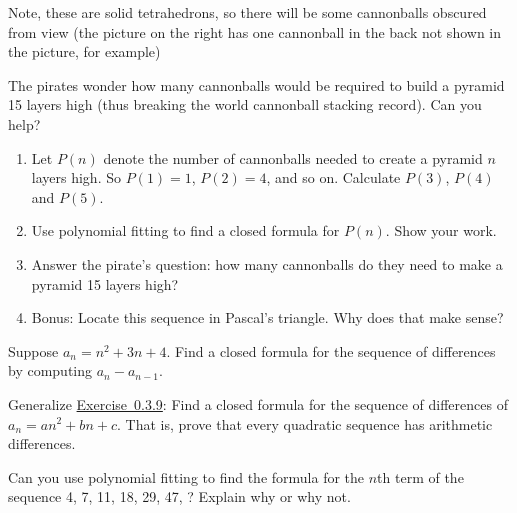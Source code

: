 \documentclass[11pt,]{book}
\theoremstyle{ptxplainnotitle}
\theoremstyle{ptxplaintitle}
\theoremstyle{ptxdefinitionnotitle}
\theoremstyle{ptxdefinitiontitle}
\theoremstyle{ptxdefinitionnotitle}
\theoremstyle{ptxdefinitiontitle}
\theoremstyle{ptxdefinitionnotitle}
\theoremstyle{ptxdefinitiontitle}
\theoremstyle{ptxdefinitiontitlenonumber}
\theoremstyle{ptxdefinitiontitlenonumber}
\numberwithin{equation}{chapter}
\begin{document}
\begin{divisionexercise}{8}
\begin{sidebyside}{3}{0.08}{0.08}{0.16}
\end{sidebyside}
\par
\hypertarget{p-414}{}%
Note, these are solid tetrahedrons, so there will be some cannonballs obscured from view (the picture on the right has one cannonball in the back not shown in the picture, for example)%
\par
\hypertarget{p-415}{}%
The pirates wonder how many cannonballs would be required to build a pyramid 15 layers high (thus breaking the world cannonball stacking record). Can you help?%
\par
\hypertarget{p-416}{}%
\leavevmode%
\begin{enumerate}[label=(\alph*)]
\item\hypertarget{li-220}{}\hypertarget{p-417}{}%
Let \(P(n)\) denote the number of cannonballs needed to create a pyramid \(n\) layers high. So \(P(1) = 1\), \(P(2) = 4\), and so on. Calculate \(P(3)\), \(P(4)\) and \(P(5)\). %
\item\hypertarget{li-221}{}\hypertarget{p-418}{}%
Use polynomial fitting to find a closed formula for \(P(n)\). Show your work. %
\item\hypertarget{li-222}{}\hypertarget{p-419}{}%
Answer the pirate's question: how many cannonballs do they need to make a pyramid 15 layers high? %
\item\hypertarget{li-223}{}\hypertarget{p-420}{}%
Bonus: Locate this sequence in Pascal's triangle. Why does that make sense?%
\end{enumerate}
%
\end{divisionexercise}%
\begin{divisionexercise}{9}\hypertarget{ex_quad-diff}{}
\hypertarget{p-423}{}%
Suppose \(a_n = n^2 + 3n + 4\text{.}\) Find a closed formula for the sequence of differences by computing \(a_n - a_{n-1}\text{.}\)%
\end{divisionexercise}%
\begin{divisionexercise}{10}\hypertarget{exercise-38}{}
\hypertarget{p-425}{}%
Generalize \hyperlink{ex_quad-diff}{Exercise~0.3.9}: Find a closed formula for the sequence of differences of \(a_n = an^2 + bn + c\). That is, prove that every quadratic sequence has arithmetic differences.%
\end{divisionexercise}%
\begin{divisionexercise}{11}\hypertarget{exercise-39}{}
\hypertarget{p-427}{}%
Can you use polynomial fitting to find the formula for the \(n\)th term of the sequence 4, 7, 11, 18, 29, 47, \textellipsis{}? Explain why or why not.%
\end{divisionexercise}%
\end{document}
